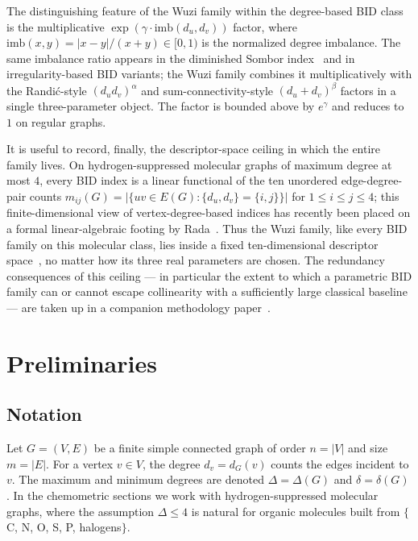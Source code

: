 \documentclass[a5paper, 10pt]{article}
\theoremstyle{plain}
\theoremstyle{remark}
\theoremstyle{definition}
\begin{document}
The distinguishing feature of the Wuzi family within the
degree-based BID class is the multiplicative
$\exp(\gamma \cdot \mathrm{imb}(d_u, d_v))$ factor, where
$\mathrm{imb}(x, y) = |x - y|/(x + y) \in [0, 1)$ is the
normalized degree imbalance. The same imbalance ratio appears
in the diminished Sombor
index~\cite{MovahediGutmanRedzepovicFurtula2026} and in
irregularity-based BID variants; the Wuzi family combines it
multiplicatively with the Randi\'c-style $(d_u d_v)^\alpha$ and
sum-connectivity-style $(d_u + d_v)^\beta$ factors in a single
three-parameter object. The factor is bounded above by
$e^{\gamma}$ and reduces to $1$ on regular graphs.

It is useful to record, finally, the descriptor-space ceiling in
which the entire family lives. On hydrogen-suppressed molecular
graphs of maximum degree at most $4$, every BID index is a linear
functional of the ten unordered edge-degree-pair counts
$m_{ij}(G) = |\{uv \in E(G) : \{d_u, d_v\} = \{i, j\}\}|$ for
$1 \le i \le j \le 4$; this finite-dimensional view of
vertex-degree-based indices has recently been placed on a formal
linear-algebraic footing by Rada~\cite{Rada2026LinearVDB}. Thus
the Wuzi family, like every BID family on this molecular class,
lies inside a fixed ten-dimensional descriptor
space~\cite{BorovicaninDasFurtulaGutman2017Zagreb}, no matter how
its three real parameters are chosen. The redundancy consequences
of this ceiling --- in particular the extent to which a
parametric BID family can or cannot escape collinearity with a
sufficiently large classical baseline --- are taken up in a
companion methodology paper~\cite{Paper2_Screening}.

\section{Preliminaries}\label{sec:prelim}

\subsection{Notation}\label{sec:notation}

Let $G = (V, E)$ be a finite simple connected graph of order
$n = |V|$ and size $m = |E|$. For a vertex $v \in V$, the degree
$d_v = d_G(v)$ counts the edges incident to $v$. The maximum and
minimum degrees are denoted $\Delta = \Delta(G)$ and
$\delta = \delta(G)$. In the chemometric sections we work with
hydrogen-suppressed molecular graphs, where the assumption
$\Delta \le 4$ is natural for organic molecules built from
$\{$C, N, O, S, P, halogens$\}$.
\end{document}
